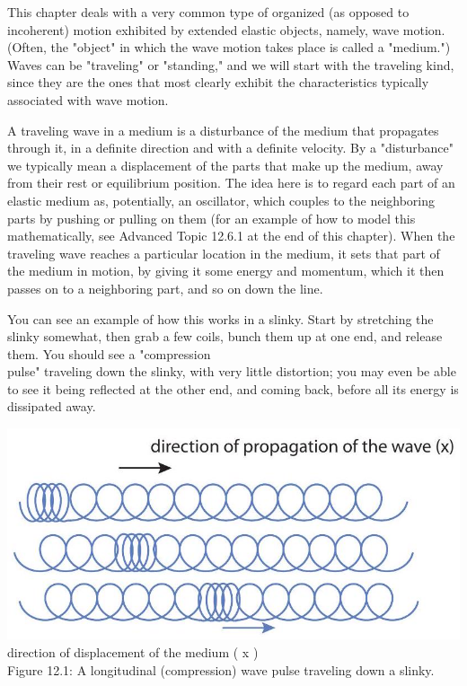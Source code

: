 \documentclass[10pt]{article}
\begin{document}
This chapter deals with a very common type of organized (as opposed to incoherent) motion exhibited by extended elastic objects, namely, wave motion. (Often, the "object" in which the wave motion takes place is called a "medium.") Waves can be "traveling" or "standing," and we will start with the traveling kind, since they are the ones that most clearly exhibit the characteristics typically associated with wave motion.

A traveling wave in a medium is a disturbance of the medium that propagates through it, in a definite direction and with a definite velocity. By a "disturbance" we typically mean a displacement of the parts that make up the medium, away from their rest or equilibrium position. The idea here is to regard each part of an elastic medium as, potentially, an oscillator, which couples to the neighboring parts by pushing or pulling on them (for an example of how to model this mathematically, see Advanced Topic 12.6.1 at the end of this chapter). When the traveling wave reaches a particular location in the medium, it sets that part of the medium in motion, by giving it some energy and momentum, which it then passes on to a neighboring part, and so on down the line.

You can see an example of how this works in a slinky. Start by stretching the slinky somewhat, then grab a few coils, bunch them up at one end, and release them. You should see a "compression\\
pulse" traveling down the slinky, with very little distortion; you may even be able to see it being reflected at the other end, and coming back, before all its energy is dissipated away.

\includegraphics[max width=\textwidth, center]{2024_09_14_9969b06773f10b6936e8g-298(1)}\\
direction of displacement of the medium ( x )\\
Figure 12.1: A longitudinal (compression) wave pulse traveling down a slinky.
\end{document}
